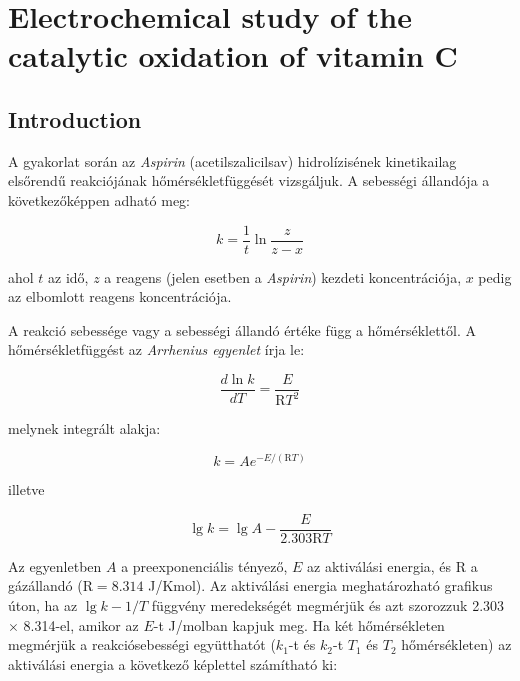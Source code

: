 \fancyhead[LO,RE]{\thesection}
\fancyfoot[LE,RO]{\thepage}

\setcounter{section}{7}
\section{Electrochemical study of the catalytic oxidation of vitamin C}
\subsection{Introduction}

A gyakorlat során az \emph{Aspirin} (acetilszalicilsav) hidrolízisének kinetikailag elsőrendű reakciójának hőmérsékletfüggését vizsgáljuk.
A sebességi állandója a következőképpen adható meg:

\begin{equation}
\label{eq:divider}
        k
        =
        \frac
                {1}
                {t}
	\ln
	\frac{z}{z-x}
\end{equation}

ahol $t$ az idő, $z$ a reagens (jelen esetben a \emph{Aspirin}) kezdeti koncentrációja, $x$ pedig az elbomlott reagens koncentrációja.

A reakció sebessége vagy a sebességi állandó értéke függ a hőmérséklettől.
A hőmérsékletfüggést az \emph{Arrhenius egyenlet} írja le:

\begin{equation}
\label{eq:divider}
        \frac
                {d\ln k}
                {dT}
	=
	\frac
		{E}
		{\mathrm{R}T^2}
\end{equation}

melynek integrált alakja:

\begin{equation}
\label{eq:divider}
        k
        =
	A
	e^{-E/( \mathrm{R} T)}
\end{equation}

illetve

\begin{equation}
\label{eq:divider}
        \lg k
        =
        \lg A
	-\frac{E}{2.303 \mathrm{R}T}
\end{equation}

Az egyenletben $A$ a preexponenciális tényező, $E$ az aktiválási energia, és R a gázállandó (R$ = 8.314$ J/Kmol).
Az aktiválási energia meghatározható grafikus úton, ha az $\lg k - 1/T$ függvény meredekségét megmérjük és azt szorozzuk 2.303 $\times$ 8.314-el, amikor az $E$-t J/molban kapjuk meg.
Ha két hőmérsékleten megmérjük a reakciósebességi együtthatót ($k_1$-t és $k_2$-t $T_1$ és $T_2$ hőmérsékleten) az aktiválási energia a következő képlettel számítható ki:

